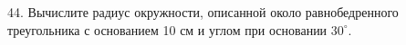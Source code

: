 44. Вычислите радиус окружности, описанной около равнобедренного треугольника с основанием 10 см и углом при основании $30^\circ.$\\
